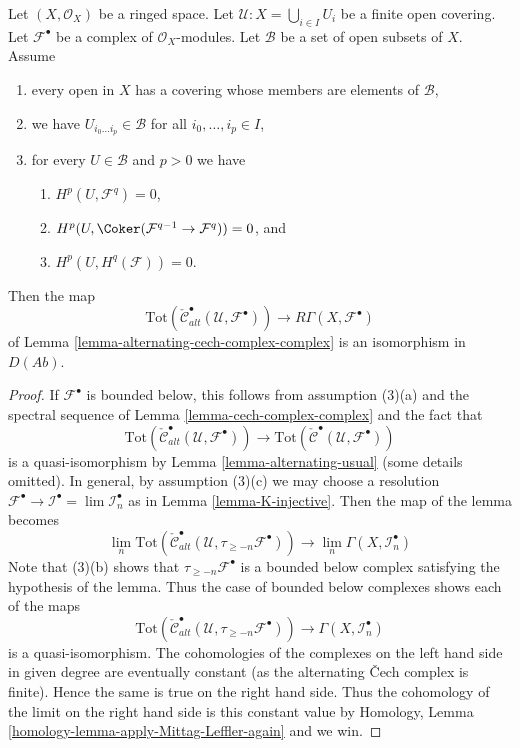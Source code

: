 \begin{lemma}
\label{lemma-alternating-cech-complex-complex-ss}
Let $(X, \mathcal{O}_X)$ be a ringed space. Let
$\mathcal{U} : X = \bigcup_{i \in I} U_i$ be a finite open covering. Let
$\mathcal{F}^\bullet$ be a complex of $\mathcal{O}_X$-modules.
Let $\mathcal{B}$ be a set of open subsets of $X$. Assume
\begin{enumerate}
\item every open in $X$ has a covering whose members are
elements of $\mathcal{B}$,
\item we have $U_{i_0\ldots i_p} \in \mathcal{B}$ for all
$i_0, \ldots, i_p \in I$,
\item for every $U \in \mathcal{B}$ and $p > 0$ we have
\begin{enumerate}
\item $H^p(U, \mathcal{F}^q) = 0$,
\item $H^p(U, \Coker(\mathcal{F}^{q - 1} \to \mathcal{F}^q)) = 0$, and
\item $H^p(U, H^q(\mathcal{F})) = 0$.
\end{enumerate}
\end{enumerate}
Then the map
$$
\text{Tot}(\check{\mathcal{C}}^\bullet_{alt}(\mathcal{U}, \mathcal{F}^\bullet))
\longrightarrow
R\Gamma(X, \mathcal{F}^\bullet)
$$
of Lemma \ref{lemma-alternating-cech-complex-complex}
is an isomorphism in $D(\textit{Ab})$.
\end{lemma}

\begin{proof}
If $\mathcal{F}^\bullet$ is bounded below, this follows from assumption
(3)(a) and the spectral sequence of
Lemma \ref{lemma-cech-complex-complex}
and the fact that
$$
\text{Tot}(\check{\mathcal{C}}^\bullet_{alt}(\mathcal{U}, \mathcal{F}^\bullet))
\longrightarrow
\text{Tot}(\check{\mathcal{C}}^\bullet(\mathcal{U}, \mathcal{F}^\bullet))
$$
is a quasi-isomorphism by
Lemma \ref{lemma-alternating-usual} (some details omitted).
In general, by assumption (3)(c) we may choose a resolution
$\mathcal{F}^\bullet \to \mathcal{I}^\bullet = \lim \mathcal{I}_n^\bullet$
as in Lemma \ref{lemma-K-injective}.
Then the map of the lemma becomes
$$
\lim_n 
\text{Tot}(\check{\mathcal{C}}^\bullet_{alt}(\mathcal{U},
\tau_{\geq -n}\mathcal{F}^\bullet))
\longrightarrow
\lim_n \Gamma(X, \mathcal{I}_n^\bullet)
$$
Note that (3)(b) shows that $\tau_{\geq -n}\mathcal{F}^\bullet$
is a bounded below complex satisfying the hypothesis of the lemma.
Thus the case of bounded below complexes shows each of the maps
$$
\text{Tot}(\check{\mathcal{C}}^\bullet_{alt}(\mathcal{U},
\tau_{\geq -n}\mathcal{F}^\bullet))
\longrightarrow
\Gamma(X, \mathcal{I}_n^\bullet)
$$
is a quasi-isomorphism. The cohomologies of the complexes on the left
hand side in given degree are eventually
constant (as the alternating {\v C}ech complex is finite).
Hence the same is true on the right hand side.
Thus the cohomology of the limit on the right hand side is
this constant value by
Homology, Lemma \ref{homology-lemma-apply-Mittag-Leffler-again} and we win.
\end{proof}






